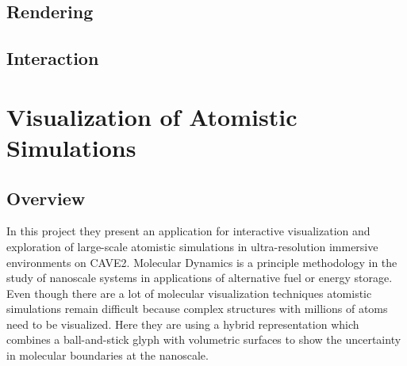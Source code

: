 \documentclass[10pt,twocolumn,letterpaper]{article}
\begin{document}
\subsection{Rendering}
\subsection{Interaction}

\section{Visualization of Atomistic Simulations}
\subsection{Overview}
In this project \cite{reda_visualizing_2013} they present an application for interactive visualization and exploration of large-scale atomistic simulations in ultra-resolution immersive environments on CAVE2. Molecular Dynamics is a principle methodology in the study of nanoscale systems in applications of alternative fuel or energy storage. Even though there are a lot of molecular visualization techniques atomistic simulations remain difficult because complex structures with millions of atoms need to be visualized. Here they are using a hybrid representation which combines a ball-and-stick glyph with volumetric surfaces to show the uncertainty in molecular boundaries at the nanoscale.
\end{document}
